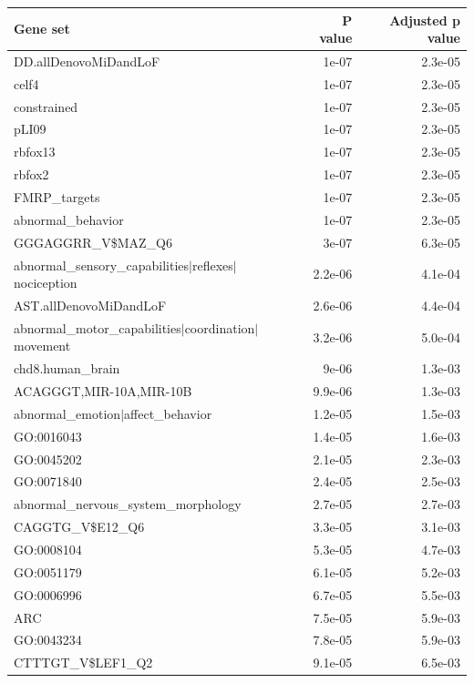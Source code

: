 \documentclass[]{article}
\begin{document}

\begin{longtable}{|l|r|r|}

\hline
Gene set & P value & Adjusted p value \\
\hline
\endhead

 DD.allDenovoMiDandLoF  &  1e-07  &  2.3e-05 \\
celf4  &  1e-07  &  2.3e-05 \\
constrained  &  1e-07  &  2.3e-05 \\
pLI09  &  1e-07  &  2.3e-05 \\
rbfox13  &  1e-07  &  2.3e-05 \\
rbfox2  &  1e-07  &  2.3e-05 \\
FMRP\_targets  &  1e-07  &  2.3e-05 \\
abnormal\_behavior  &  1e-07  &  2.3e-05 \\
GGGAGGRR\_V\$MAZ\_Q6  &  3e-07  &  6.3e-05 \\
abnormal\_sensory\_capabilities$|$reflexes$|$nociception  &  2.2e-06  &  4.1e-04 \\
AST.allDenovoMiDandLoF  &  2.6e-06  &  4.4e-04 \\
abnormal\_motor\_capabilities$|$coordination$|$movement  &  3.2e-06  &  5.0e-04 \\
chd8.human\_brain  &  9e-06  &  1.3e-03 \\
ACAGGGT,MIR-10A,MIR-10B  &  9.9e-06  &  1.3e-03 \\
abnormal\_emotion$|$affect\_behavior  &  1.2e-05  &  1.5e-03 \\
GO:0016043  &  1.4e-05  &  1.6e-03 \\
GO:0045202  &  2.1e-05  &  2.3e-03 \\
GO:0071840  &  2.4e-05  &  2.5e-03 \\
abnormal\_nervous\_system\_morphology  &  2.7e-05  &  2.7e-03 \\
CAGGTG\_V\$E12\_Q6  &  3.3e-05  &  3.1e-03 \\
GO:0008104  &  5.3e-05  &  4.7e-03 \\
GO:0051179  &  6.1e-05  &  5.2e-03 \\
GO:0006996  &  6.7e-05  &  5.5e-03 \\
ARC  &  7.5e-05  &  5.9e-03 \\
GO:0043234  &  7.8e-05  &  5.9e-03 \\
CTTTGT\_V\$LEF1\_Q2  &  9.1e-05  &  6.5e-03 \\

\end{longtable}
\end{document}
